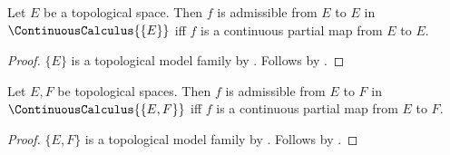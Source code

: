 \begin{theorem}\label{continuous_single_model_admissibility}
    Let $E$ be a topological space.
    Then $f$ is admissible from $E$ to $E$ in $\ContinuousCalculus{\{E\}}$ iff
        $f$ is a continuous partial map from $E$ to $E$.
\end{theorem}
\begin{proof}
    $\{E\}$ is a topological model family by .
    Follows by .
\end{proof}

\begin{theorem}\label{continuous_two_model_admissibility}
    Let $E,F$ be topological spaces.
    Then $f$ is admissible from $E$ to $F$ in $\ContinuousCalculus{\{E,F\}}$ iff
        $f$ is a continuous partial map from $E$ to $F$.
\end{theorem}
\begin{proof}
    $\{E,F\}$ is a topological model family by .
    Follows by .
\end{proof}
